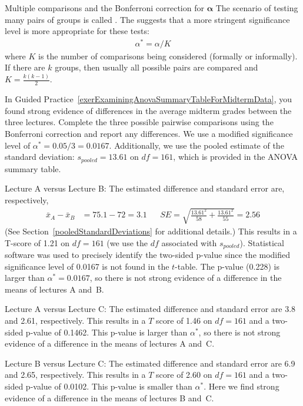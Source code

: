 \begin{onebox}{Multiple comparisons and the Bonferroni
    correction for $\pmb{\alpha}$}
  The scenario of testing many pairs of groups is called
  .
  The  suggests that a more
  stringent significance level is more appropriate for
  these tests:
  \begin{align*}
  \alpha^* = \alpha / K
  \end{align*}
  where $K$ is the number of comparisons being considered
  (formally or informally).
  If there are $k$ groups, then usually all possible pairs
  are compared and $K=\frac{k(k-1)}{2}$.
\end{onebox}

\begin{examplewrap}
\begin{nexample}{In Guided
    Practice~\ref{exerExaminingAnovaSummaryTableForMidtermData},
    you found strong evidence of differences in the average
    midterm grades between the three lectures.
    Complete the three possible pairwise comparisons using
    the Bonferroni correction and report any differences.}
  \label{multipleComparisonsOfThreeStatClasses}%
  We use a modified significance level of
  $\alpha^* = 0.05 / 3 = 0.0167$.
  Additionally, we use the pooled estimate of the standard
  deviation:
  $s_{pooled}=13.61$ on $df=161$,
  which is provided in the ANOVA summary table.

  Lecture A versus Lecture B:
  The estimated difference and standard error are,
  respectively,
  \begin{align*}
  \bar{x}_A - \bar{x}_{B} &= 75.1 - 72 = 3.1
  &&SE = \sqrt{\frac{13.61^2}{58} + \frac{13.61^2}{55}} = 2.56
  \end{align*}
  (See Section~\vref{pooledStandardDeviations}
  for additional details.)
  This results in a T-score of 1.21 on $df = 161$
  (we use the $df$ associated with $s_{pooled}$).
  Statistical software was used to precisely identify the two-sided
  p-value since the modified significance level of 0.0167 is not
  found in the $t$-table.
  The p-value (0.228) is larger than $\alpha^*=0.0167$,
  so there is not strong evidence of a difference in the means
  of lectures A and~B.

  Lecture A versus Lecture C: The estimated difference and
  standard error are 3.8 and 2.61, respectively.
  This results in a $T$ score of 1.46 on $df = 161$
  and a two-sided p-value of 0.1462.
  This p-value is larger than $\alpha^*$, so there is not
  strong evidence of a difference in the means of lectures
  A and~C.

  Lecture B versus Lecture C: The estimated difference
  and standard error are 6.9 and 2.65, respectively.
  This results in a $T$ score of 2.60 on $df = 161$
  and a two-sided p-value of 0.0102.
  This p-value is smaller than $\alpha^*$.
  Here we find strong evidence of a difference in the
  means of lectures B and~C.
\end{nexample}
\end{examplewrap}

